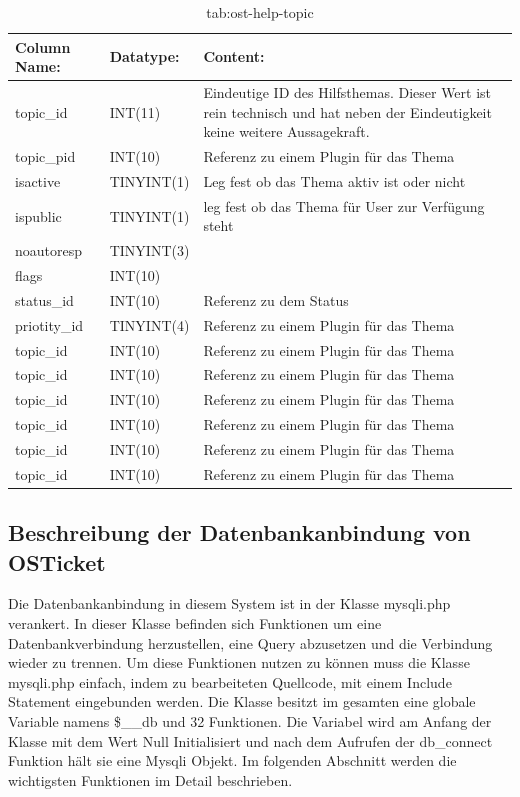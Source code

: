 \begin{table}[h]
	\begin{tabular}{|p{3.5cm}|p{4cm}|p{6.2cm}|}
		\hline
		\textbf{Column Name:} & \textbf{Datatype:} & \textbf{Content:}\\
		\hline
		topic\_id & INT(11) & Eindeutige ID des Hilfsthemas. Dieser Wert ist rein technisch und hat  neben der Eindeutigkeit keine weitere Aussagekraft.\\
		\hline
		topic\_pid & INT(10) & Referenz zu einem Plugin für das Thema\\
		\hline
		isactive & TINYINT(1) & Leg fest ob das Thema aktiv ist oder nicht \\
		\hline
		ispublic & TINYINT(1) & leg fest ob das Thema für User zur Verfügung steht\\
		\hline
		noautoresp & TINYINT(3) & \\
		\hline
		flags & INT(10) & \\
		\hline
		status\_id & INT(10) & Referenz zu dem Status \\
		\hline
		priotity\_id & TINYINT(4) & Referenz zu einem Plugin für das Thema\\
		\hline
		topic\_id & INT(10) & Referenz zu einem Plugin für das Thema\\
		\hline
		topic\_id & INT(10) & Referenz zu einem Plugin für das Thema\\
		\hline
		topic\_id & INT(10) & Referenz zu einem Plugin für das Thema\\
		\hline
		topic\_id & INT(10) & Referenz zu einem Plugin für das Thema\\
		\hline
		topic\_id & INT(10) & Referenz zu einem Plugin für das Thema\\
		\hline
		topic\_id & INT(10) & Referenz zu einem Plugin für das Thema\\
		\hline
		
	\end{tabular}
	\caption{tab:ost-help-topic}
\end{table}
\label{tab:ost_help_topic}

\newpage


\subsection{Beschreibung der Datenbankanbindung von OSTicket}
Die Datenbankanbindung in diesem System ist in der Klasse mysqli.php verankert. In dieser Klasse befinden sich Funktionen um eine Datenbankverbindung herzustellen, eine Query abzusetzen und die Verbindung wieder zu trennen.
Um diese Funktionen nutzen zu können muss die Klasse mysqli.php einfach, indem zu bearbeiteten Quellcode, mit einem Include Statement eingebunden werden.
Die Klasse besitzt im gesamten eine globale Variable namens \$\_\_db und 32 Funktionen. Die Variabel wird am Anfang der Klasse mit dem Wert Null Initialisiert und nach dem Aufrufen der db\_connect Funktion hält sie eine Mysqli Objekt.
Im folgenden Abschnitt werden die wichtigsten Funktionen im Detail beschrieben.

